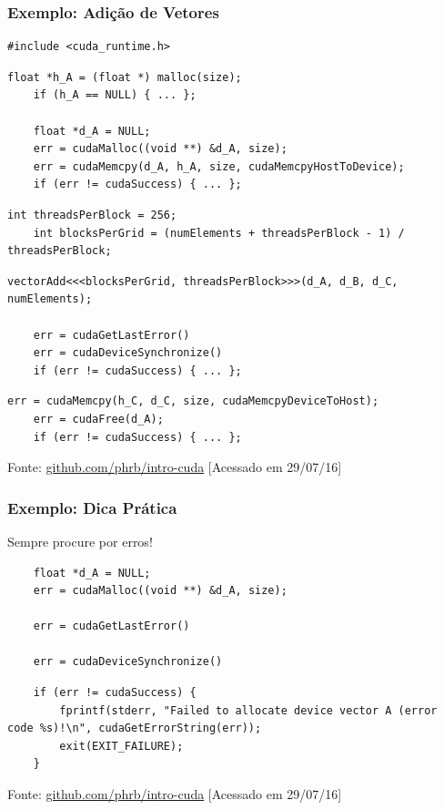 \documentclass[10pt, compress]{beamer}
\begin{document}
\begin{frame}[fragile]
    \frametitle{Exemplo: Adição de Vetores}
    \begin{lstlisting}[basicstyle=\ttfamily\scriptsize]
    #include <cuda_runtime.h>
    \end{lstlisting}
    \pause
    \begin{lstlisting}[basicstyle=\ttfamily\scriptsize]
    float *h_A = (float *) malloc(size);
    if (h_A == NULL) { ... };

    float *d_A = NULL;
    err = cudaMalloc((void **) &d_A, size);
    err = cudaMemcpy(d_A, h_A, size, cudaMemcpyHostToDevice);
    if (err != cudaSuccess) { ... };
    \end{lstlisting}
    \pause
    \begin{lstlisting}[basicstyle=\ttfamily\scriptsize]
    int threadsPerBlock = 256;
    int blocksPerGrid = (numElements + threadsPerBlock - 1) / threadsPerBlock;
    \end{lstlisting}
    \pause
    \begin{lstlisting}[basicstyle=\ttfamily\scriptsize]
    vectorAdd<<<blocksPerGrid, threadsPerBlock>>>(d_A, d_B, d_C, numElements);

    err = cudaGetLastError()
    err = cudaDeviceSynchronize()
    if (err != cudaSuccess) { ... };
    \end{lstlisting}
    \pause
    \begin{lstlisting}[basicstyle=\ttfamily\scriptsize]
    err = cudaMemcpy(h_C, d_C, size, cudaMemcpyDeviceToHost);
    err = cudaFree(d_A);
    if (err != cudaSuccess) { ... };
    \end{lstlisting}

    \vfill

    \begin{center}
        \tiny{Fonte: \url{github.com/phrb/intro-cuda} [Acessado em 29/07/16]}
    \end{center}
\end{frame}

\begin{frame}[fragile]
    \frametitle{Exemplo: Dica Prática}
    \alert{Sempre} procure por erros!

    \begin{lstlisting}
    float *d_A = NULL;
    err = cudaMalloc((void **) &d_A, size);

    err = cudaGetLastError()

    err = cudaDeviceSynchronize()
    \end{lstlisting}
    \pause
    \begin{lstlisting}
    if (err != cudaSuccess) {
        fprintf(stderr, "Failed to allocate device vector A (error code %s)!\n", cudaGetErrorString(err));
        exit(EXIT_FAILURE);
    }
    \end{lstlisting}

    \begin{center}
        \tiny{Fonte: \url{github.com/phrb/intro-cuda} [Acessado em 29/07/16]}
    \end{center}
\end{frame}
\end{document}
